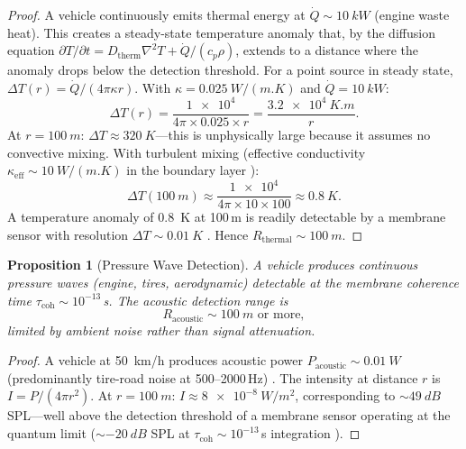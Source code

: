 \documentclass[11pt,twocolumn,a4paper]{article}
\theoremstyle{plain}
\newtheorem{proposition}[theorem]{Proposition}
\theoremstyle{definition}
\theoremstyle{remark}
\newcommand{\taucoh}{\tau_{\mathrm{coh}}}
\newcommand{\Dtherm}{D_{\mathrm{therm}}}
\begin{document}
\begin{proof}
A vehicle continuously emits thermal energy at $\dot{Q} \sim \SI{10}{kW}$ (engine waste heat). This creates a steady-state temperature anomaly that, by the diffusion equation $\partial T/\partial t = \Dtherm \nabla^2 T + \dot{Q}/(c_p \rho)$, extends to a distance where the anomaly drops below the detection threshold. For a point source in steady state, $\Delta T(r) = \dot{Q}/(4\pi \kappa r)$. With $\kappa = \SI{0.025}{W/(m.K)}$ and $\dot{Q} = \SI{10}{kW}$:
\begin{equation}
\Delta T(r) = \frac{\num{1e4}}{4\pi \times 0.025 \times r} = \frac{\SI{3.2e4}{K.m}}{r}.
\end{equation}
At $r = \SI{100}{m}$: $\Delta T \approx \SI{320}{K}$---this is unphysically large because it assumes no convective mixing. With turbulent mixing (effective conductivity $\kappa_{\mathrm{eff}} \sim \SI{10}{W/(m.K)}$ in the boundary layer \cite{stull1988introduction}):
\begin{equation}
\Delta T(\SI{100}{m}) \approx \frac{\num{1e4}}{4\pi \times 10 \times 100} \approx \SI{0.8}{K}.
\end{equation}
A temperature anomaly of \SI{0.8}{K} at 100\,m is readily detectable by a membrane sensor with resolution $\Delta T \sim \SI{0.01}{K}$ \cite{sachikonye2026membrane}. Hence $R_{\mathrm{thermal}} \sim \SI{100}{m}$.
\end{proof}

\begin{proposition}[Pressure Wave Detection]
\label{prop:pressure}
A vehicle produces continuous pressure waves (engine, tires, aerodynamic) detectable at the membrane coherence time $\taucoh \sim 10^{-13}$\,s. The acoustic detection range is
\begin{equation}
R_{\mathrm{acoustic}} \sim \SI{100}{m} \text{ or more},
\label{eq:R_acoustic}
\end{equation}
limited by ambient noise rather than signal attenuation.
\end{proposition}

\begin{proof}
A vehicle at \SI{50}{km/h} produces acoustic power $P_{\mathrm{acoustic}} \sim \SI{0.01}{W}$ (predominantly tire-road noise at 500--2000\,Hz) \cite{schlichting2017boundary}. The intensity at distance $r$ is $I = P/(4\pi r^2)$. At $r = \SI{100}{m}$: $I \approx \SI{8e-8}{W/m^2}$, corresponding to $\sim \SI{49}{dB}$ SPL---well above the detection threshold of a membrane sensor operating at the quantum limit ($\sim \SI{-20}{dB}$ SPL at $\taucoh \sim 10^{-13}$\,s integration \cite{sachikonye2026membrane}).
\end{proof}
\end{document}
